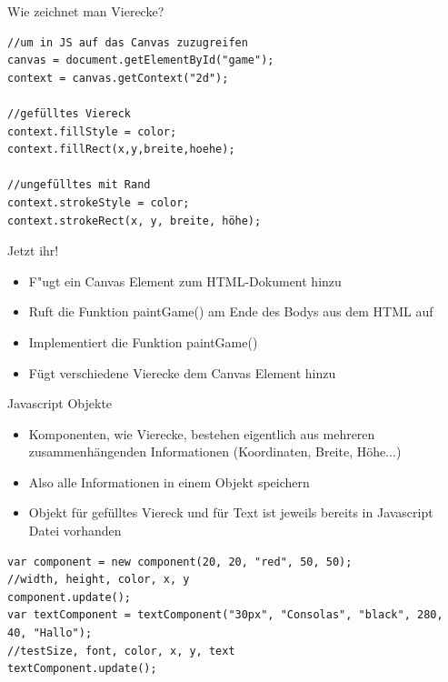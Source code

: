 \documentclass[18pt]{beamer}
\begin{document}
\begin{frame}[fragile]{Wie zeichnet man Vierecke?}
\begin{lstlisting}
//um in JS auf das Canvas zuzugreifen
canvas = document.getElementById("game");
context = canvas.getContext("2d");

//gefülltes Viereck
context.fillStyle = color;
context.fillRect(x,y,breite,hoehe);

//ungefülltes mit Rand
context.strokeStyle = color;
context.strokeRect(x, y, breite, höhe);
\end{lstlisting}

\end{frame}

\begin{frame}{Jetzt ihr!}
\begin{itemize}
	\item F"ugt ein Canvas Element zum HTML-Dokument hinzu
	\item Ruft die Funktion \glqq paintGame()\grqq{}  am Ende des Bodys aus dem HTML auf
	\item Implementiert die Funktion  \glqq paintGame()\grqq{} 
	\item Fügt verschiedene Vierecke dem Canvas Element hinzu
\end{itemize}
\end{frame}

\begin{frame}[fragile]{Javascript Objekte}
\begin{itemize}
	\item Komponenten, wie Vierecke, bestehen eigentlich aus mehreren zusammenhängenden Informationen (Koordinaten, Breite, Höhe...)
	\item Also alle Informationen in einem Objekt speichern 
	\item Objekt für gefülltes Viereck und für Text ist jeweils bereits in Javascript Datei vorhanden 
	
\end{itemize}
 \begin{lstlisting}
var component = new component(20, 20, "red", 50, 50);
//width, height, color, x, y
component.update();
var textComponent = textComponent("30px", "Consolas", "black", 280, 40, "Hallo");
//testSize, font, color, x, y, text
textComponent.update();
\end{lstlisting}
\end{frame}
\end{document}
